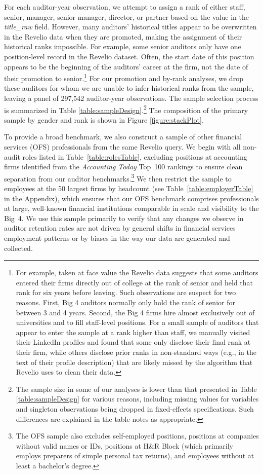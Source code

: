 \documentclass[11pt]{article}
\begin{document}
        For each auditor-year observation, we attempt to assign a rank of either staff, senior, manager, senior manager, director, or partner based on the value in the \textit{title\_raw} field. However, many auditors' historical titles appear to be overwritten in the Revelio data when they are promoted, making the assignment of their historical ranks impossible. For example, some senior auditors only have one position-level record in the Revelio dataset. Often, the start date of this position appears to be the beginning of the auditors' career at the firm, not the date of their promotion to senior.\footnote{For example, taken at face value the Revelio data suggests that some auditors entered their firms directly out of college at the rank of senior and held that rank for six years before leaving. Such observations are suspect for two reasons. First, Big 4 auditors normally only hold the rank of senior for between 3 and 4 years. Second, the Big 4 firms hire almost exclusively out of universities and to fill staff-level positions. For a small sample of auditors that appear to enter the sample at a rank higher than staff, we manually visited their LinkedIn profiles and found that some only disclose their final rank at their firm, while others disclose prior ranks in non-standard ways (e.g., in the text of their profile description) that are likely missed by the algorithm that Revelio uses to clean their data.} For our promotion and by-rank analyses, we drop these auditors for whom we are unable to infer historical ranks from the sample, leaving a panel of 297,542 auditor-year observations. The sample selection process is summarized in Table \ref{table:sampleDesign}.\footnote{The sample size in some of our analyses is lower than that presented in Table \ref{table:sampleDesign} for various reasons, including missing values for variables and singleton observations being dropped in fixed-effects specifications. Such differences are explained in the table notes as appropriate.} The composition of the primary sample by gender and rank is shown in Figure \ref{figure:stackPlot}.
        
        To provide a broad benchmark, we also construct a sample of other financial services (OFS) professionals from the same Revelio query. We begin with all non-audit roles listed in Table~\ref{table:rolesTable}, excluding positions at accounting firms identified from the \textit{Accounting Today} Top~100 rankings to ensure clean separation from our auditor benchmarks.\footnote{The OFS sample also excludes self-employed positions, positions at companies without valid names or IDs, positions at H\&R Block (which primarily employs preparers of simple personal tax returns), and employees without at least a bachelor's degree.} We then restrict the sample to employees at the 50 largest firms by headcount (see Table~\ref{table:employerTable} in the Appendix), which ensures that our OFS benchmark comprises professionals at large, well-known financial institutions comparable in scale and visibility to the Big~4. We use this sample primarily to verify that any changes we observe in auditor retention rates are not driven by general shifts in financial services employment patterns or by biases in the way our data are generated and collected.
\end{document}
